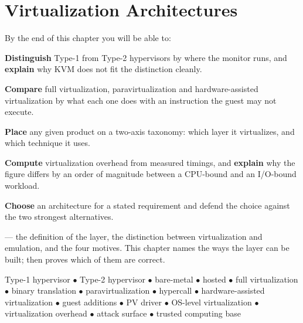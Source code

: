 \chapter{Virtualization Architectures}\label{ch:architectures}

\begin{outcomes}
By the end of this chapter you will be able to:
\begin{tight}
  \item \textbf{Distinguish} Type-1 from Type-2 hypervisors by where the monitor
        runs, and \textbf{explain} why KVM does not fit the distinction
        cleanly.
  \item \textbf{Compare} full virtualization, paravirtualization and
        hardware-assisted virtualization by what each one does with an
        instruction the guest may not execute.
  \item \textbf{Place} any given product on a two-axis taxonomy: which layer it
        virtualizes, and which technique it uses.
  \item \textbf{Compute} virtualization overhead from measured timings, and
        \textbf{explain} why the figure differs by an order of magnitude
        between a CPU-bound and an I/O-bound workload.
  \item \textbf{Choose} an architecture for a stated requirement and defend the
        choice against the two strongest alternatives.
\end{tight}
\end{outcomes}

\begin{prereq}
 --- the definition of the layer, the distinction between
virtualization and emulation, and the four motives. This chapter names the ways
the layer can be built;  then proves which of them are correct.
\end{prereq}

\begin{keyterms}
Type-1 hypervisor $\bullet$ Type-2 hypervisor $\bullet$ bare-metal $\bullet$
hosted $\bullet$ full virtualization $\bullet$ binary translation $\bullet$
paravirtualization $\bullet$ hypercall $\bullet$ hardware-assisted
virtualization $\bullet$ guest additions $\bullet$ PV driver $\bullet$
OS-level virtualization $\bullet$ virtualization overhead $\bullet$ attack
surface $\bullet$ trusted computing base
\end{keyterms}

